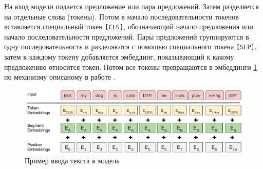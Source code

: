 \documentclass[PI, VKR]{HSEUniversity}
\begin{document}
На вход модели подается предложение или пара предложений. Затем разделяется на отдельные слова (токены). Потом в начало последовательности токенов вставляется специальный токен \texttt{[CLS]}, обозначающий начало предложения или начало последовательности предложений. Пары предложений группируются в одну последовательность и разделяются с помощью специального токена \texttt{[SEP]}, затем к каждому токену добавляется эмбеддинг, показывающий к какому предложению относится токен. Потом все токены превращаются в эмбеддинги \ref{fig:inputemebeddings} по механизму описаному в работе \autocite{NIPS2017_3f5ee243}.

\begin{figure}[h]
\centering
\includegraphics[width=.9\linewidth]{img/Input_Emebeddings.pdf}
\caption{\label{fig:inputemebeddings}Пример ввода текста в модель}
\end{figure}
\end{document}
